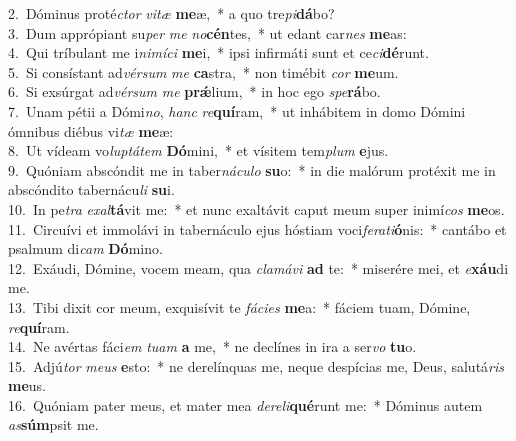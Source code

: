 {2.~}Dóminus proté\textit{ctor} \textit{vi}\textit{tæ} \textbf{me}æ,~* a quo tre\textit{pi}\textbf{dá}bo?\\
{3.~}Dum apprópiant su\textit{per} \textit{me} \textit{no}\textbf{cén}tes,~* ut edant car\textit{nes} \textbf{me}as:\\
{4.~}Qui tríbulant me i\textit{ni}\textit{mí}\textit{ci} \textbf{me}i,~* ipsi infirmáti sunt et ce\textit{ci}\textbf{dé}runt.\\
{5.~}Si consístant ad\textit{vér}\textit{sum} \textit{me} \textbf{ca}stra,~* non timébit \textit{cor} \textbf{me}um.\\
{6.~}Si exsúrgat ad\textit{vér}\textit{sum} \textit{me} \textbf{prǽ}lium,~* in hoc ego \textit{spe}\textbf{rá}bo.\\
{7.~}Unam pétii a Dómi\textit{no}, \textit{hanc} \textit{re}\textbf{quí}ram,~* ut inhábitem in domo Dómini ómnibus diébus vi\textit{tæ} \textbf{me}æ:\\
{8.~}Ut vídeam vo\textit{lup}\textit{tá}\textit{tem} \textbf{Dó}mini,~* et vísitem tem\textit{plum} \textbf{e}jus.\\
{9.~}Quóniam abscóndit me in taber\textit{ná}\textit{cu}\textit{lo} \textbf{su}o:~* in die malórum protéxit me in abscóndito tabernácu\textit{li} \textbf{su}i.\\
{10.~}In pe\textit{tra} \textit{e}\textit{xal}\textbf{tá}vit me:~* et nunc exaltávit caput meum super inimí\textit{cos} \textbf{me}os.\\
{11.~}Circuívi et immolávi in tabernáculo ejus hóstiam voci\textit{fe}\textit{ra}\textit{ti}\textbf{ó}nis:~* cantábo et psalmum di\textit{cam} \textbf{Dó}mino.\\
{12.~}Exáudi, Dómine, vocem meam, qua \textit{cla}\textit{má}\textit{vi} \textbf{ad} te:~* miserére mei, et \textit{e}\textbf{xáu}di me.\\
{13.~}Tibi dixit cor meum, exquisívit te \textit{fá}\textit{ci}\textit{es} \textbf{me}a:~* fáciem tuam, Dómine, \textit{re}\textbf{quí}ram.\\
{14.~}Ne avértas fáci\textit{em} \textit{tu}\textit{am} \textbf{a} me,~* ne declínes in ira a ser\textit{vo} \textbf{tu}o.\\
{15.~}Adjú\textit{tor} \textit{me}\textit{us} \textbf{e}sto:~* ne derelínquas me, neque despícias me, Deus, salutá\textit{ris} \textbf{me}us.\\
{16.~}Quóniam pater meus, et mater mea \textit{de}\textit{re}\textit{li}\textbf{qué}runt me:~* Dóminus autem \textit{as}\textbf{súm}psit me.\\
